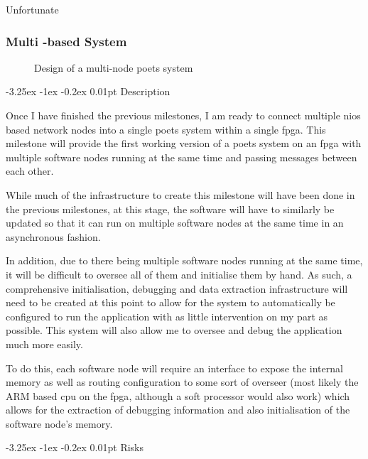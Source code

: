 \documentclass[paper=a4, fontsize=11pt, bibliography=totocnumbered]{scrartcl}
\makeatletter
\renewcommand\paragraph{\@startsection{paragraph}{4}{\z@}%
  {-3.25ex \@plus -1ex \@minus -0.2ex}%
  {0.01pt}%
  {\raggedsection\normalfont\sectfont\nobreak\size@paragraph}%
}
\numberwithin{equation}{section}		%
\numberwithin{figure}{section}			%
\numberwithin{table}{section}				%
\makeatother
\begin{document}
Unfortunate

\subsubsection{Multi -based  System}
\label{subsec:multi_nios}

\begin{figure}[h]
\centering
{}
\caption{Design of a multi-node \gls{poets} system}
\label{fig:multi_node}
\end{figure}

\paragraph{Description}

Once I have finished the previous milestones, I am ready to connect multiple \gls{nios} based \glspl{network node} into a single \gls{poets} system within a single \gls{fpga}. This milestone will provide the first working version of a \gls{poets} system on an \gls{fpga} with multiple \glspl{software node} running at the same time and passing \glspl{message} between each other.

While much of the infrastructure to create this milestone will have been done in the previous milestones, at this stage, the software will have to similarly be updated so that it can run on multiple \glspl{software node} at the same time in an asynchronous fashion.

In addition, due to there being multiple \glspl{software node} running at the same time, it will be difficult to oversee all of them and initialise them by hand. As such, a comprehensive initialisation, debugging and data extraction infrastructure will need to be created at this point to allow for the system to automatically be configured to run the application with as little intervention on my part as possible. This system will also allow me to oversee and debug the application much more easily.

To do this, each \gls{software node} will require an interface to expose the internal memory as well as routing configuration to some sort of overseer (most likely the ARM based \gls{cpu} on the \gls{fpga}, although a \gls{soft processor} would also work) which allows for the extraction of debugging information and also initialisation of the \gls{software node}'s memory.

\paragraph{Risks}
\end{document}
